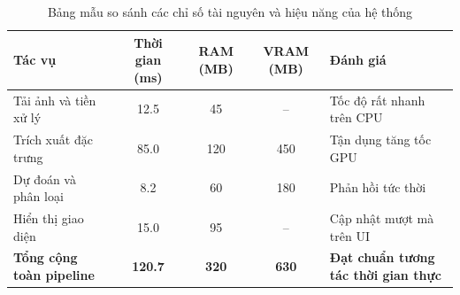 % 

\begin{table}[htbp]
\centering
\caption{Bảng mẫu so sánh các chỉ số tài nguyên và hiệu năng của hệ thống}
\label{tab:sample_modular_table}
\begin{tabularx}{\textwidth}{l c c c X}
    \toprule
    \textbf{Tác vụ} & \textbf{Thời gian (ms)} & \textbf{RAM (MB)} & \textbf{VRAM (MB)} & \textbf{Đánh giá} \\
    \midrule
    Tải ảnh và tiền xử lý & 12.5 & 45 & -- & Tốc độ rất nhanh trên CPU \\
    Trích xuất đặc trưng & 85.0 & 120 & 450 & Tận dụng tăng tốc GPU \\
    Dự đoán và phân loại & 8.2 & 60 & 180 & Phản hồi tức thời \\
    Hiển thị giao diện & 15.0 & 95 & -- & Cập nhật mượt mà trên UI \\
    \midrule
    \textbf{Tổng cộng toàn pipeline} & \textbf{120.7} & \textbf{320} & \textbf{630} & \textbf{Đạt chuẩn tương tác thời gian thực} \\
    \bottomrule
\end{tabularx}
\end{table}
